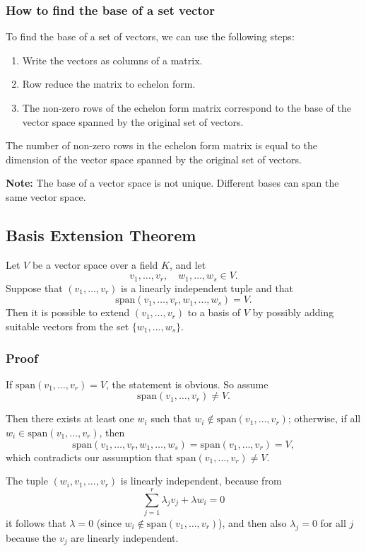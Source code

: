\subsubsection{How to find the base of a set vector}
To find the base of a set of vectors, we can use the following steps:
\begin{enumerate}
	\item Write the vectors as columns of a matrix.
	\item Row reduce the matrix to echelon form.
	\item The non-zero rows of the echelon form matrix correspond to the base of the vector space spanned by the original set of vectors.
\end{enumerate}
The number of non-zero rows in the echelon form matrix is equal to the dimension of the vector space spanned by the original set of vectors.

\textbf{Note:} The base of a vector space is not unique. Different bases can span the same vector space.

\subsection{Basis Extension Theorem}

Let \(V\) be a vector space over a field \(K\), and let 
\[
v_1, \ldots, v_r,\quad w_1, \ldots, w_s \in V.
\]
Suppose that \((v_1, \ldots, v_r)\) is a linearly independent tuple and that
\[
\text{span}(v_1, \ldots, v_r, w_1, \ldots, w_s) = V.
\]
Then it is possible to extend \((v_1, \ldots, v_r)\) to a basis of \(V\) by possibly adding suitable vectors from the set \(\{w_1, \ldots, w_s\}\).

\subsubsection*{Proof}

If \(\text{span}(v_1, \ldots, v_r) = V\), the statement is obvious. So assume
\[
\text{span}(v_1, \ldots, v_r) \neq V.
\]

Then there exists at least one \(w_i\) such that \(w_i \notin \text{span}(v_1, \ldots, v_r)\); otherwise, if all \(w_i \in \text{span}(v_1, \ldots, v_r)\), then
\[
\text{span}(v_1, \ldots, v_r, w_1, \ldots, w_s) = \text{span}(v_1, \ldots, v_r) = V,
\]
which contradicts our assumption that \(\text{span}(v_1, \ldots, v_r) \neq V\).

The tuple \((w_i, v_1, \ldots, v_r)\) is linearly independent, because from
\[
\sum_{j=1}^r \lambda_j v_j + \lambda w_i = 0
\]
it follows that \(\lambda = 0\) (since \(w_i \notin \text{span}(v_1, \ldots, v_r)\)), and then also \(\lambda_j = 0\) for all \(j\) because the \(v_j\) are linearly independent.

